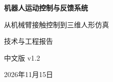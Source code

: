 

\hypersetup{pageanchor=false}
\begin{titlepage}
\centering\vspace*{24mm}
{\songti\bfseries{}机器人运动控制与反馈系统\par}
\vspace{9mm}
{\songti{}从机械臂接触控制到三维人形仿真\par}
\vspace{15mm}
{技术与工程报告\par}
\vfill
{中文版 v1.2\par}
\vspace{5mm}
{2026年11月15日\par}
\vspace*{22mm}
\end{titlepage}
\frontmatter\hypersetup{pageanchor=true}

\tableofcontents\listoffigures\listoftables
\mainmatter










\appendix




\backmatter

